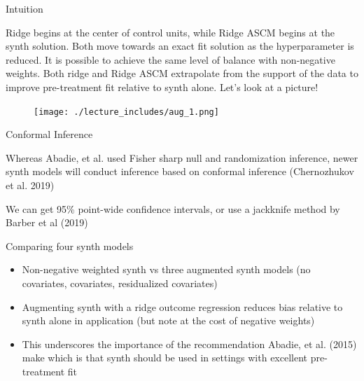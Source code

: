 \documentclass{beamer}
\begin{document}
\begin{frame}{Intuition}

Ridge begins at the center of control units, while Ridge ASCM begins at the synth solution. Both move towards an exact fit solution as the hyperparameter is reduced. It is possible to achieve the same level of balance with non-negative weights.  Both ridge and Ridge ASCM extrapolate from the support of the data to improve pre-treatment fit relative to synth alone. Let's look at a picture!


\end{frame}



\begin{frame}[plain]

	\begin{figure}
	\texttt{[image: ./lecture\_includes/aug\_1.png]}
	\end{figure}
	
\end{frame}	


\begin{frame}{Conformal Inference}

Whereas Abadie, et al. used Fisher sharp null and randomization inference, newer synth models will conduct inference based on conformal inference  (Chernozhukov et al. 2019)

\bigskip

We can get 95\% point-wide confidence intervals, or use a jackknife method by Barber et al (2019) 

\end{frame}


\begin{frame}{Comparing four synth models}

\begin{itemize}
\item Non-negative weighted synth vs three augmented synth models (no covariates, covariates, residualized covariates)
\item Augmenting synth with a ridge outcome regression reduces bias relative to synth alone in application (but note at the cost of negative weights)
\item This underscores the importance of the recommendation Abadie, et al. (2015) make which is that synth should be used in settings with excellent pre-treatment fit
\end{itemize}

\end{frame}
\end{document}
